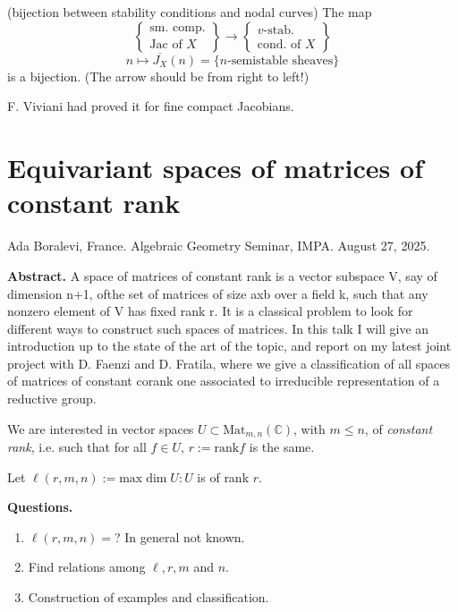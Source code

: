 \begin{theorem}[-, et al]
\label{theorem-bijec-stabi-condi-nodal}
(bijection between stability conditions and
nodal curves) The map
$$
\left\{ \substack{\text{sm. comp.} \\
\text{Jac of $X$}} \right\} \to
\left\{ \substack{\text{$v$-stab.} \\
\text{cond. of $X$}} \right\}
$$
$$
n\mapsto
\overline{J_X}(n)=\{n\text{-semistable
sheaves}\}
$$
is a bijection. (The arrow should be from
right to left!)
\end{theorem}

F. Viviani had proved it for fine compact
Jacobians.

\section{Equivariant spaces of matrices of
constant rank}
\label{section-equiv-space-matri-const}

\noindent
Ada Boralevi, France.
Algebraic Geometry Seminar, IMPA.
August 27, 2025.

\medskip\noindent
{\bf Abstract.} A space of matrices of
constant rank is a vector subspace V, say
of dimension n+1, ofthe set of matrices of
size axb over a field k, such that
any nonzero element of V has fixed rank r. It
is a classical problem to look for
different ways to construct such spaces of
matrices. In this talk I will give an
introduction up to the state of the art of
the topic, and report on my latest
joint project with D. Faenzi and D. Fratila,
where we give a classification of
all spaces of matrices of constant corank one
associated to irreducible
representation of a reductive group.

\medskip\noindent

We are interested in vector spaces $U \subset
\text{Mat}_{m,n}(\mathbb{C})$,
with $m \leq n$, of {\it constant rank}, i.e.
such that for all $f \in U$,
$r:=\text{rank}f$ is the same.

Let $\ell(r,m,n):=\text{max}\dim U:U$ is of
rank $r$.

\medskip\noindent
{\bf Questions.}
\begin{enumerate}
\item $\ell(r,m,n)=$? In general not known.
\item Find relations among $\ell, r,m$ and
$n$.
\item Construction of examples and
classification.
\end{enumerate}

